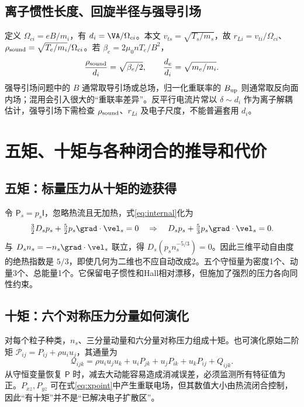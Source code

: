 \subsection{离子惯性长度、回旋半径与强导引场}
定义 $\Omega_{ci}=eB/m_i$，有 $d_i=\VA/\Omega_{ci}$。本文 $v_{ts}=\sqrt{T_s/m_s}$，故 $r_{Li}=v_{ti}/\Omega_{ci}$、$\rho_{\rm sound}=\sqrt{T_e/m_i}/\Omega_{ci}$。若 $\beta_e=2\mu_0nT_e/B^2$，
\begin{equation}{\rho_{\rm sound}\over d_i}=\sqrt{\beta_e/2},\qquad {d_e\over d_i}=\sqrt{m_e/m_i}.
\end{equation}
强导引场问题中的 $B$ 通常取导引场或总场，归一化重联率的 $B_{\rm up}$ 则通常取反向面内场；混用会引入很大的“重联率差异”。反平行电流片常以 $\delta\sim d_i$ 作为离子解耦估计，强导引场下需检查 $\rho_{\rm sound}$、$r_{Li}$ 及电子尺度，不能普遍套用 $d_i$。

\section{五矩、十矩与各种闭合的推导和代价}
\subsection{五矩：标量压力从十矩的迹获得}
令 $\mathsf P_s=p_s\mathsf I$，忽略热流且无加热，式\eqref{eq:internal}化为
\begin{equation}\tfrac32D_sp_s+\tfrac52p_s\grad\cdot\vel_s=0
\quad\Rightarrow\quad D_sp_s+\tfrac53p_s\grad\cdot\vel_s=0.
\end{equation}
与 $D_sn_s=-n_s\grad\cdot\vel_s$ 联立，得 $D_s(p_sn_s^{-5/3})=0$。因此三维平动自由度的绝热指数是 $5/3$，即使几何为二维也不应自动改成2。五个守恒量为密度1个、动量3个、总能量1个。它保留电子惯性和Hall相对漂移，但施加了强烈的压力各向同性约束。

\subsection{十矩：六个对称压力分量如何演化}
对每个粒子种类，$n_s$、三分量动量和六分量对称压力组成十矩。也可演化原始二阶矩 $\mathcal P_{ij}=P_{ij}+\rho u_iu_j$，其通量为
\begin{equation}\mathcal Q_{ijk}=\rho u_iu_ju_k+u_iP_{jk}+u_jP_{ik}+u_kP_{ij}+Q_{ijk}.
\end{equation}
从守恒变量恢复 $\mathsf P$ 时，减去大动能容易造成消减误差，必须监测所有特征值为正。$P_{xz},P_{yz}$ 可在式\eqref{eq:xpoint}中产生重联电场，但其数值大小由热流闭合控制，因此“有十矩”并不是“已解决电子扩散区”。\citep{Wang2015}

